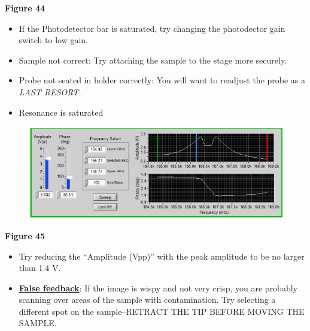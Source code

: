 \documentclass{../lab}
\begin{document}
\textbf{Figure 44}

\begin{itemize}
    \item If the Photodetector bar is saturated, try changing the photodector gain switch to low gain.

\end{itemize}

\begin{itemize}
    \item Sample not correct:  Try attaching the sample to the stage more securely.

    \item Probe not seated in holder correctly:  You will want to readjust the probe as a \emph{LAST RESORT.}

    \item Resonance is saturated

\end{itemize}


\begin{figure}[h]
    \centering
    \href{http://experimentationlab.berkeley.edu/sites/default/files/AFMImages/54.png}{\includegraphics[width=0.5\linewidth]{images/54.png}}
    \caption{}
    \label{fig:54}
\end{figure}

\textbf{Figure 45}

\begin{itemize}
    \item Try reducing the ``Amplitude (Vpp)'' with the peak amplitude to be no larger than 1.4 V.

    \item \href{http://experimentationlab.berkeley.edu/sites/default/files/AFMImages/VM\%204.2.\%20On\%20Cont-small\%20vib\_converted\_r1.mp4}{\textbf{False feedback}}:  If the image is wispy and not very crisp, you are probably scanning over areas of the sample with contamination.  Try selecting a different spot on the sample--RETRACT THE TIP BEFORE MOVING THE SAMPLE.

\end{itemize}
\end{document}
